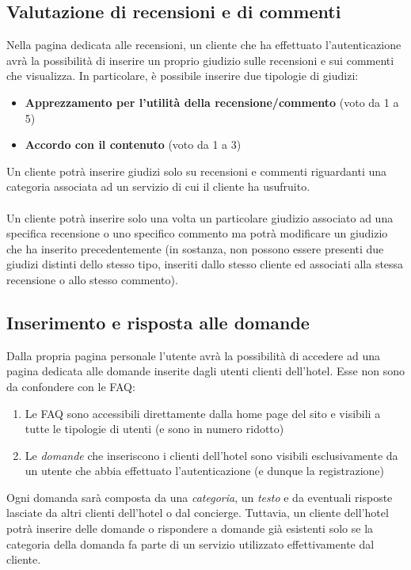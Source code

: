 \documentclass [a4paper, 12pt]{book}
\begin{document}
\subsection{Valutazione di recensioni e di commenti}
\label{ValutazioneRecensioni}
Nella pagina dedicata alle recensioni, un cliente che ha effettuato l'autenticazione avrà la possibilità di inserire un proprio giudizio sulle recensioni e sui commenti che visualizza. In particolare, è possibile inserire due tipologie di giudizi:
\begin{itemize}
\item \textbf{Apprezzamento per l'utilità della recensione/commento} (voto da 1 a 5)
\item \textbf{Accordo con il contenuto} (voto da 1 a 3)
\end{itemize}
Un cliente potrà inserire giudizi solo su recensioni e commenti riguardanti una categoria associata ad un servizio di cui il cliente ha usufruito.\\\\
Un cliente potrà inserire solo una volta un particolare giudizio associato ad una specifica recensione o uno specifico commento ma potrà modificare un giudizio che ha inserito precedentemente (in sostanza, non possono essere presenti due giudizi distinti dello stesso tipo, inseriti dallo stesso cliente ed associati alla stessa recensione o allo stesso commento).

\medskip

\subsection{Inserimento e risposta alle domande}
Dalla propria pagina personale l'utente avrà la possibilità di accedere ad una pagina dedicata alle domande inserite dagli utenti clienti dell'hotel. Esse non sono da confondere con le FAQ:
\begin{enumerate}
\item Le FAQ sono accessibili direttamente dalla home page del sito e visibili a tutte le tipologie di utenti (e sono in numero ridotto)
\item Le \textit{domande} che inseriscono i clienti dell'hotel sono visibili esclusivamente da un utente che abbia effettuato l'autenticazione (e dunque la registrazione)
\end{enumerate}
Ogni domanda sarà composta da una \textit{categoria}, un \textit{testo} e da eventuali risposte lasciate da altri clienti dell'hotel o dal concierge. Tuttavia, un cliente dell'hotel potrà inserire delle domande o rispondere a domande già esistenti solo  se la categoria della domanda fa parte di un servizio utilizzato effettivamente dal cliente.
\end{document}
